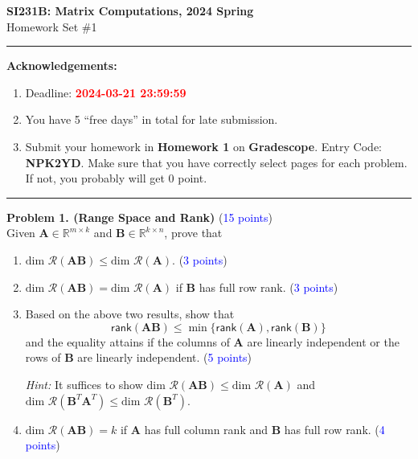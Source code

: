 \documentclass[english,onecolumn]{IEEEtran}
\begin{document}
\begin{center}
	\textbf{\LARGE{SI231B: Matrix Computations, 2024 Spring}}\\
	{\Large Homework Set \#1}\\
\par\end{center}

\noindent
\rule{\linewidth}{0.4pt}
{\bf Acknowledgements:}
\begin{enumerate}
	\item Deadline: {\bf \textcolor{red}{2024-03-21 23:59:59}}
    \item You have 5 ``free days'' in total for late submission.
	\item Submit your homework in \textbf{Homework 1} on \textbf{Gradescope}. Entry Code: \textbf{NPK2YD}. Make sure that you have correctly select pages for each problem. If not, you probably will get 0 point.
\end{enumerate}
\rule{\linewidth}{0.4pt}

\noindent \textbf{Problem 1. (Range Space and Rank)} (\textcolor{blue}{15 points}) \\
Given $\mathbf{A}\in\mathbb{R}^{m\times k}$
and $\mathbf{B}\in\mathbb{R}^{k\times n}$, prove that
\begin{enumerate}
\item $\text{dim }\mathcal{R}(\mathbf{A}\mathbf{B})\leq\text{dim }\mathcal{R}(\mathbf{A})$. (\textcolor{blue}{3 points})
\item $\text{dim }\mathcal{R}(\mathbf{A}\mathbf{B})=\text{dim }\mathcal{R}(\mathbf{A})$
if $\mathbf{B}$ has full row rank. (\textcolor{blue}{3 points})
\item Based on the above two results, show that
\[
\mathsf{rank}(\mathbf{A}\mathbf{B})\leq\min\{\mathsf{rank}(\mathbf{A}),\mathsf{rank}(\mathbf{B})\}
\]
and the equality attains if the columns of $\mathbf{A}$ are linearly
independent or the rows of $\mathbf{B}$ are linearly independent. (\textcolor{blue}{5 points})

\noindent \emph{Hint:} It suffices to show $\text{dim }\mathcal{R}(\mathbf{A}\mathbf{B})\leq\text{dim }\mathcal{R}(\mathbf{A})$
and $\text{dim }\mathcal{R}(\mathbf{B}^{T}\mathbf{A}^{T})\leq\text{dim }\mathcal{R}(\mathbf{B}^{T})$.
\item $\text{dim }\mathcal{R}(\mathbf{A}\mathbf{B})=k$ if $\mathbf{A}$
has full column rank and $\mathbf{B}$ has full row rank. (\textcolor{blue}{4 points})
\end{enumerate}
\newpage
\end{document}
